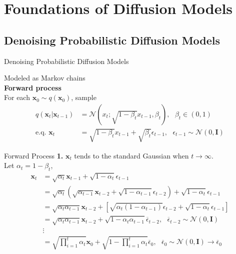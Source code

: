 \section{Foundations of Diffusion Models}
\subsection{Denoising Probabilistic Diffusion Models}

\begin{frame}{Denoising Probabilistic Diffusion Models}

Modeled as Markov chains\\
\textbf{Forward process}\\
For each $\mathbf{x}_0\sim q(\mathbf{x}_0)$, sample
        \begin{align}
            q(\mathbf{x}_t|\mathbf{x}_{t-1})&=\mathcal{N}(x_t;\sqrt{1-\beta_t}x_{t-1}, \beta_t),\,\,\,\,\beta_t\in(0,1)\\
            \text{e.q. } \mathbf{x}_t&=\sqrt{1-\beta_t}x_{t-1}+\sqrt{\beta_t}\epsilon_{t-1},\,\,\,\,\epsilon_{t-1}\sim\mathcal{N}(0,\mathbf{I})
        \end{align}
\end{frame}

\begin{frame}{Forward Process}
\textbf{1.} $\mathbf{x}_t$ tends to the standard Gaussian when $t\to\infty$.\\
Let $\alpha_t=1-\beta_t$,
\begin{align*}
 \mathbf{x}_t
 &=\sqrt{\alpha_t} \mathbf{x}_{t-1}+\sqrt{1-\alpha_t}\epsilon_{t-1}\\
 &=\sqrt{\alpha_t}(\sqrt{\alpha_{t-1}} \mathbf{x}_{t-2}+\sqrt{1-\alpha_{t-1}}\epsilon_{t-2})+\sqrt{1-\alpha_t}\epsilon_{t-1}\\
  &=\sqrt{\alpha_t\alpha_{t-1}} \mathbf{x}_{t-2}+[\sqrt{\alpha_t(1-\alpha_{t-1})}\epsilon_{t-2}+\sqrt{1-\alpha_t}\epsilon_{t-1}]\\
 &= \sqrt{\alpha_t\alpha_{t-1}} \mathbf{x}_{t-2}+ \sqrt{1-\alpha_t\alpha_{t-1}}\overline{\epsilon}_{t-2},\,\,\,\,\overline{\epsilon}_{t-2}\sim\mathcal{N}(0,\mathbf{I})\\
 &\vdots\\
 &=\sqrt{\prod\limits_{i=1}^t\alpha_t}\mathbf{x}_{0}+\sqrt{1-\prod\limits_{i=1}^t\alpha_t}\overline{\epsilon}_0,\,\,\,\,\overline{\epsilon}_0\sim\mathcal{N}(0,\mathbf{I})\to \overline{\epsilon}_0
\end{align*}
\end{frame}


